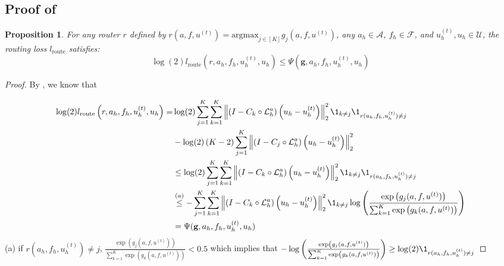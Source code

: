 \documentclass{article}
\newtheorem{proposition}[theorem]{Proposition}
\begin{document}
\subsection{Proof of } \label{sec:proofupperbound}

\begin{proposition} \label{th:upperbound}
    For any router $r$ defined by $r(a, f, u^{(t)}) = \text{argmax}_{j \in [K]} g_j(a, f, u^{(t)})$, any $a_h \in \mathcal{A}$, $f_h \in \mathcal{F}$, and $u_h^{(t)}, u_h \in \mathcal{U}$, the routing loss $l_{\text{route}}$ satisfies:
    \begin{equation*}
        \log(2)l_{\text{route}}\left(r, a_h, f_h, u^{(t)}_h, u_h\right)\leq \Psi(\mathbf{g}, a_h, f_h, u_h^{(t)}, u_h) 
    \end{equation*}
\end{proposition}


\begin{proof}

By , we know that

\begin{align*}
    \log(2)l_{\text{route}}\left(r, a_h, f_h, u^{(t)}_h, u_h\right) = &\log(2)\sum_{j = 1}^K \sum_{k = 1}^K\left\|\left( I - C_{k} \circ \mathcal{L}_{h}^a\right)\left(u_h - u^{(t)}_h\right)\right\|^2_2\1_{k\neq j}\1_{r(a_h, f_h, u^{(t)}_h) \neq j} \\
     &-\log(2)\left(K - 2\right)\sum_{j = 1}^K\left\|\left( I - C_{j} \circ \mathcal{L}_{h}^a\right)\left(u_h - u^{(t)}_h\right)\right\|^2_2 \\
     &\leq \log(2)\sum_{j = 1}^K \sum_{k = 1}^K\left\|\left( I - C_{k} \circ \mathcal{L}_{h}^a\right)\left(u_h - u^{(t)}_h\right)\right\|^2_2\1_{k\neq j}\1_{r(a_h, f_h, u^{(t)}_h) \neq j} \\
     &\overset{(a)}{\leq} -\sum_{j = 1}^K \sum_{k = 1}^K\left\|\left( I - C_{k} \circ \mathcal{L}_{h}^a\right)\left(u_h - u^{(t)}_h\right)\right\|^2_2\1_{k\neq j}\log\left(\frac{\exp\left(g_j(a, f, u^{(t)})\right)}{\sum_{k = 1}^K\exp\left(g_k(a, f, u^{(t)})\right)}\right) \\
     &= \Psi(\mathbf{g}, a_h, f_h, u_h^{(t)}, u_h)
\end{align*}
(a) if $r(a_h, f_h, u^{(t)}_h) \neq j$, $\frac{\exp\left(g_j(a, f, u^{(t)})\right)}{\sum_{k = 1}^K\exp\left(g_k(a, f, u^{(t)})\right)} < 0.5$ which implies that $-\log\left(\frac{\exp\left(g_j(a, f, u^{(t)})\right)}{\sum_{k = 1}^K\exp\left(g_k(a, f, u^{(t)})\right)}\right)  \geq \log(2)\1_{r(a_h, f_h, u^{(t)}_h) \neq j}$

\end{proof}
\end{document}
